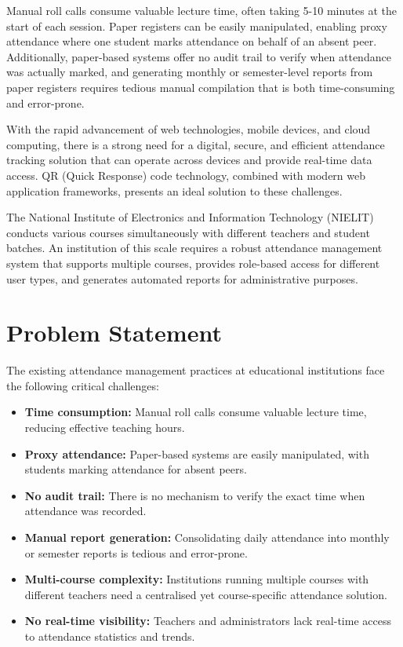 \documentclass{SOICTthesis}
\begin{document}
Manual roll calls consume valuable lecture time, often taking 5-10 minutes at the start of each session. Paper registers can be easily manipulated, enabling proxy attendance where one student marks attendance on behalf of an absent peer. Additionally, paper-based systems offer no audit trail to verify when attendance was actually marked, and generating monthly or semester-level reports from paper registers requires tedious manual compilation that is both time-consuming and error-prone.

With the rapid advancement of web technologies, mobile devices, and cloud computing, there is a strong need for a digital, secure, and efficient attendance tracking solution that can operate across devices and provide real-time data access. QR (Quick Response) code technology, combined with modern web application frameworks, presents an ideal solution to these challenges.

The National Institute of Electronics and Information Technology (NIELIT) conducts various courses simultaneously with different teachers and student batches. An institution of this scale requires a robust attendance management system that supports multiple courses, provides role-based access for different user types, and generates automated reports for administrative purposes.

\section{Problem Statement}
\label{sec:problem_statement}

The existing attendance management practices at educational institutions face the following critical challenges:

\begin{itemize}
    \item \textbf{Time consumption:} Manual roll calls consume valuable lecture time, reducing effective teaching hours.
    \item \textbf{Proxy attendance:} Paper-based systems are easily manipulated, with students marking attendance for absent peers.
    \item \textbf{No audit trail:} There is no mechanism to verify the exact time when attendance was recorded.
    \item \textbf{Manual report generation:} Consolidating daily attendance into monthly or semester reports is tedious and error-prone.
    \item \textbf{Multi-course complexity:} Institutions running multiple courses with different teachers need a centralised yet course-specific attendance solution.
    \item \textbf{No real-time visibility:} Teachers and administrators lack real-time access to attendance statistics and trends.
\end{itemize}
\end{document}
